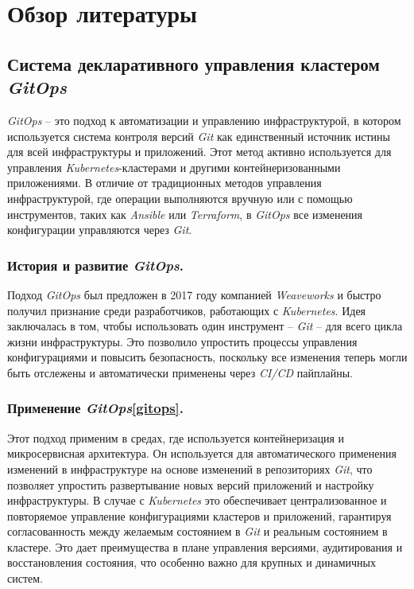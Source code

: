 \section{Обзор литературы}
\subsection{Система декларативного управления кластером \textit{GitOps}}
\label{sec:gitops}
\textit{GitOps} -- это подход к автоматизации и управлению инфраструктурой, в котором используется система контроля версий \textit{Git} как единственный источник истины для всей инфраструктуры и приложений. Этот метод активно используется для управления \textit{Kubernetes}-кластерами и другими контейнеризованными приложениями. В отличие от традиционных методов управления инфраструктурой, где операции выполняются вручную или с помощью инструментов, таких как \textit{Ansible} или \textit{Terraform}, в \textit{GitOps} все изменения конфигурации управляются через \textit{Git}. 

\subsubsection{История и развитие \textit{GitOps}.}
Подход \textit{GitOps} был предложен в 2017 году компанией \textit{Weaveworks} и быстро получил признание среди разработчиков, работающих с \textit{Kubernetes}. Идея заключалась в том, чтобы использовать один инструмент -- \textit{Git} -- для всего цикла жизни инфраструктуры. Это позволило упростить процессы управления конфигурациями и повысить безопасность, поскольку все изменения теперь могли быть отслежены и автоматически применены через \textit{CI/CD} пайплайны.

\subsubsection{Применение \textit{GitOps}\ref{gitops}.}
Этот подход применим в средах, где используется контейнеризация и микросервисная архитектура. Он используется для автоматического применения изменений в инфраструктуре на основе изменений в репозиториях \textit{Git}, что позволяет упростить развертывание новых версий приложений и настройку инфраструктуры. В случае с \textit{Kubernetes} это обеспечивает централизованное и повторяемое управление конфигурациями кластеров и приложений, гарантируя согласованность между желаемым состоянием в \textit{Git} и реальным состоянием в кластере. Это дает преимущества в плане управления версиями, аудитирования и восстановления состояния, что особенно важно для крупных и динамичных систем.

